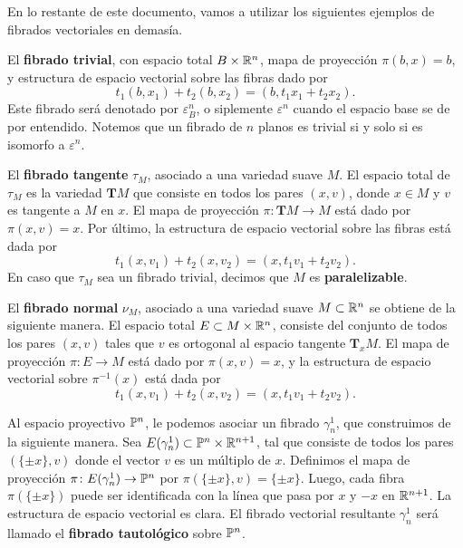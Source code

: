 
En lo restante de este documento, vamos a utilizar los siguientes ejemplos de fibrados vectoriales en demasía.

\begin{example}
	El \textbf{fibrado trivial}, con espacio total $B \times \R^{n}$, mapa de proyección $\pi(b,x) = b$, y estructura de espacio vectorial sobre las fibras dado por
	\[ t_{1}(b,x_{1}) + t_{2}(b,x_{2}) = (b, t_{1}x_{1} + t_{2}x_{2}). \]
	Este fibrado será denotado por $\varepsilon_{B}^{n}$, o siplemente $\varepsilon^{n}$ cuando el espacio base se de por entendido. Notemos que un fibrado de $n$ planos es trivial si y solo si es isomorfo a $\varepsilon^{n}$.
\end{example}

\begin{example}
	El \textbf{fibrado tangente} $\tau_{M}$, asociado a una variedad suave $M$. El espacio total de $\tau_{M}$ es la variedad $\mathbf{T}M$ que consiste en todos los pares $(x,v)$, donde $x \in M$ y $v$ es tangente a $M$ en $x$. El mapa de proyección $\pi \colon \mathbf{T}M \to M$ está dado por $\pi(x,v) = x$. Por último, la estructura de espacio vectorial sobre las fibras está dada por
	\[ t_{1}(x,v_{1}) + t_{2}(x,v_{2}) = (x, t_{1}v_{1} + t_{2}v_{2}). \]
	En caso que $\tau_{M}$ sea un fibrado trivial, decimos que $M$ es \textbf{paralelizable}. \par
\end{example}

\begin{example}
	El \textbf{fibrado normal} $\nu_{M}$, asociado a una variedad suave $M \subset \R^{n}$ se obtiene de la siguiente manera. El espacio total $E \subset M \times \R^{n}$, consiste del conjunto de todos los pares $(x,v)$ tales que $v$ es ortogonal al espacio tangente $\mathbf{T}_{x}M$. El mapa de proyección $\pi \colon E \to M$ está dado por $\pi(x,v) = x$, y la estructura de espacio vectorial sobre $\pi^{-1}(x)$ está dada por
	\[ t_{1}(x,v_{1}) + t_{2}(x,v_{2}) = (x, t_{1}v_{1} + t_{2}v_{2}). \]
\end{example}

\begin{example}
	Al espacio proyectivo $\P^{n}$, le podemos asociar un fibrado $\gamma_{n}^{1}$, que construimos de la siguiente manera. Sea $E(\gamma_{n}^{1}) \subset \P^{n} \times \R^{n+1}$, tal que consiste de todos los pares $(\{ \pm x \}, v)$ donde el vector $v$ es un múltiplo de $x$. Definimos el mapa de proyección $\pi \colon E(\gamma_{n}^{1}) \to \P^{n}$ por $\pi(\{ \pm x \}, v) = \{ \pm x \}$. Luego, cada fibra $\pi(\{ \pm x \})$ puede ser identificada con la línea que pasa por $x$ y $-x$ en $\R^{n+1}$. La estructura de espacio vectorial es clara. El fibrado vectorial resultante $\gamma_{n}^{1}$ será llamado el \textbf{fibrado tautológico} sobre $\P^{n}$.
\end{example}


